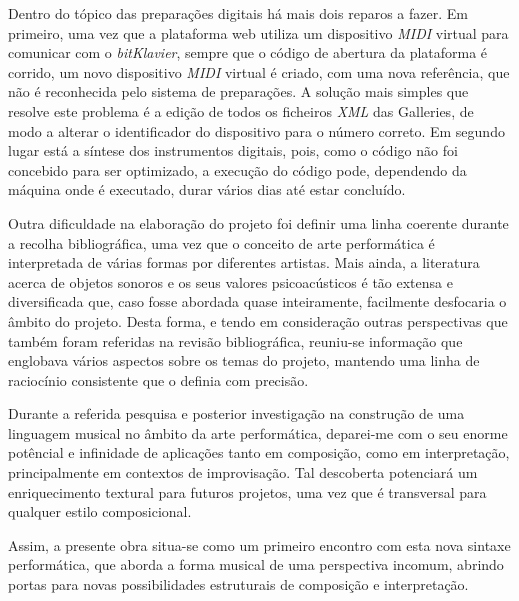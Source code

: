 \documentclass[../main.tex]{subfiles}
\begin{document}
Dentro do tópico das preparações digitais há mais dois reparos a fazer. Em primeiro, uma vez que a plataforma web utiliza um dispositivo \textsl{MIDI} virtual para comunicar com o \textsl{bitKlavier}, sempre que o código de abertura da plataforma é corrido, um novo dispositivo \textsl{MIDI} virtual é criado, com uma nova referência, que não é reconhecida pelo sistema de preparações. A solução mais simples que resolve este problema é a edição de todos os ficheiros \textsl{XML} das Galleries, de modo a alterar o identificador do dispositivo para o número correto. Em segundo lugar está a síntese dos instrumentos digitais, pois, como o código não foi concebido para ser optimizado, a execução do código pode, dependendo da máquina onde é executado, durar vários dias até estar concluído.

Outra dificuldade na elaboração do projeto foi definir uma linha coerente durante a recolha bibliográfica, uma vez que o conceito de arte performática é interpretada de várias formas por diferentes artistas. Mais ainda, a literatura acerca de objetos sonoros e os seus valores psicoacústicos é tão extensa e diversificada que, caso fosse abordada quase inteiramente, facilmente desfocaria o âmbito do projeto. Desta forma, e tendo em consideração outras perspectivas que também foram referidas na revisão bibliográfica, reuniu-se informação que englobava vários aspectos sobre os temas do projeto, mantendo uma linha de raciocínio consistente que o definia com precisão.    

Durante a referida pesquisa e posterior investigação na construção de uma linguagem musical no âmbito da arte performática, deparei-me com o seu enorme potêncial e infinidade de aplicações tanto em composição, como em interpretação, principalmente em contextos de improvisação. Tal descoberta potenciará um enriquecimento textural para futuros projetos, uma vez que é transversal para qualquer estilo composicional.

Assim, a presente obra situa-se como um primeiro encontro com esta nova sintaxe performática, que aborda a forma musical de uma perspectiva incomum, abrindo portas para novas possibilidades estruturais de composição e interpretação.
\end{document}
